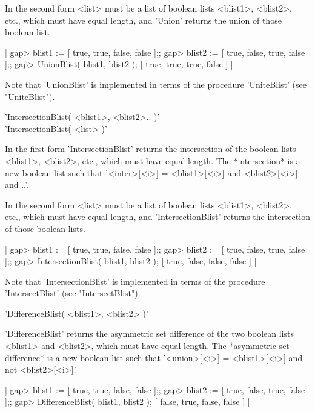In  the second form  <list> must  be a  list  of boolean lists  <blist1>,
<blist2>, etc.,  which  must have  equal length,  and 'Union' returns the
union of those boolean list.

|    gap> blist1 := [ true, true, false, false ];;
    gap> blist2 := [ true, false, true, false ];;
    gap> UnionBlist( blist1, blist2 );
    [ true, true, true, false ] |

Note  that 'UnionBlist'  is  implemented   in terms  of    the  procedure
'UniteBlist' (see "UniteBlist").


'IntersectionBlist( <blist1>, <blist2>.. )'\\
'IntersectionBlist( <list> )'

In the first  form 'IntersectionBlist'  returns  the intersection  of the
boolean  lists <blist1>, <blist2>,  etc., which  must  have equal length.
The  *intersection*  is a  new boolean   list such  that  '<inter>[<i>] =
<blist1>[<i>] and <blist2>[<i>] and ..'.

In  the  second form <list>   must be a  list of  boolean lists <blist1>,
<blist2>, etc., which   must have equal  length,  and 'IntersectionBlist'
returns the intersection of those boolean lists.

|    gap> blist1 := [ true, true, false, false ];;
    gap> blist2 := [ true, false, true, false ];;
    gap> IntersectionBlist( blist1, blist2 );
    [ true, false, false, false ] |

Note that 'IntersectionBlist'  is implemented in terms  of  the procedure
'IntersectBlist' (see "IntersectBlist").


'DifferenceBlist( <blist1>, <blist2> )'

'DifferenceBlist'  returns the  asymmetric  set  difference  of the   two
boolean  lists <blist1> and <blist2>, which  must have equal length.  The
*asymmetric set difference* is a new boolean list such that '<union>[<i>]
= <blist1>[<i>] and not <blist2>[<i>]'.

|    gap> blist1 := [ true, true, false, false ];;
    gap> blist2 := [ true, false, true, false ];;
    gap> DifferenceBlist( blist1, blist2 );
    [ false, true, false, false ] |

